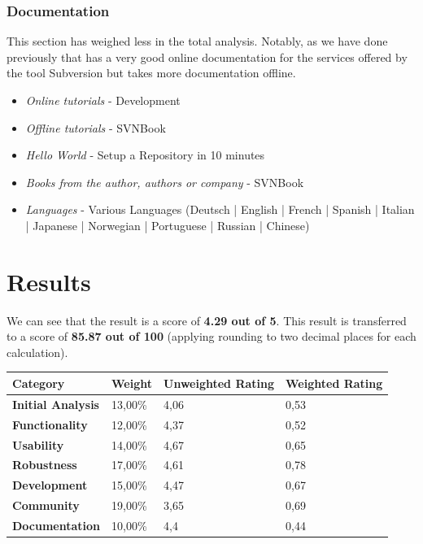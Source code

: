 \documentclass[11pt]{scrartcl}
\begin{document}
\subsubsection{Documentation}

\par This section has weighed less in the total analysis. Notably, as we have done previously that has a very good online documentation for the services offered by the tool Subversion but takes more documentation offline.

\begin{itemize}
    \item \emph{Online tutorials} - Development
    \item \emph{Offline tutorials} - SVNBook
    \item \emph{Hello World} - Setup a Repository in 10 minutes
    \item \emph{Books from the author, authors or company} - SVNBook
    \item \emph{Languages} - Various Languages (Deutsch | English | French | Spanish | Italian | Japanese | Norwegian | Portuguese | Russian | Chinese)
\end{itemize}

\section{Results}

We can see that the result is a score of \textbf{4.29 out of 5}. This result is transferred to a score of \textbf{85.87 out of 100} (applying rounding to two decimal places for each calculation).

\begin{tabular}{|l|l|l|l|}
    \hline {\bf Category} & {\bf Weight} & {\bf Unweighted Rating} & {\bf Weighted Rating}\\
    \hline {\bf Initial Analysis}	 & 13,00\% & 4,06 & 0,53 \\
    \hline {\bf Functionality} & 12,00\% & 4,37 & 0,52\\
    \hline {\bf Usability} & 14,00\% & 4,67 & 0,65\\
    \hline {\bf Robustness} & 17,00\% & 4,61 & 0,78\\
    \hline {\bf Development} & 15,00\% & 4,47 & 0,67\\
    \hline {\bf Community} & 19,00\% & 3,65 & 0,69\\
    \hline {\bf Documentation} & 10,00\% & 4,4 & 0,44\\
    \hline
\end{tabular}
\end{document}
